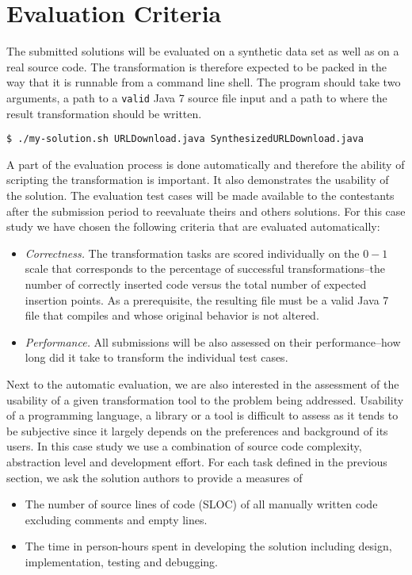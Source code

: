 
\section{Evaluation Criteria}
\label{sec:EvaluationCriteria}

The submitted solutions will be evaluated on a synthetic data set as well as on a real source code.
The transformation is therefore expected to be packed in the way that it is runnable from a command line shell.
The program should take two arguments, a path to a \texttt{valid} Java 7 source file input and a path to where the result transformation should be written.
%
\begin{verbatim}
$ ./my-solution.sh URLDownload.java SynthesizedURLDownload.java
\end{verbatim}

A part of the evaluation process is done automatically and therefore the ability of scripting the transformation is important.
It also demonstrates the usability of the solution.
The evaluation test cases will be made available to the contestants after the submission period to reevaluate theirs and others solutions.
For this case study we have chosen the following criteria that are evaluated automatically:
%
\begin{itemize}[--]
  \item \emph{Correctness.} The transformation tasks are scored individually on the $0-1$ scale that corresponds to the percentage of successful transformations--\Ie the number of correctly inserted code versus the total number of expected insertion points.
  As a prerequisite, the resulting file must be a valid Java 7 file that compiles and whose original behavior is not altered.
  
  \item \emph{Performance.} All submissions will be also assessed on their performance--\Ie how long did it take to transform the individual test cases.
\end{itemize}

Next to the automatic evaluation, we are also interested in the assessment of the usability of a given transformation tool to the problem being addressed.
Usability of a programming language, a library or a tool is difficult to assess as it tends to be subjective since it largely depends on the preferences and background of its users.
In this case study we use a combination of source code complexity, abstraction level and development effort.
For each task defined in the previous section, we ask the solution authors to provide a measures of 
%
\begin{itemize}[--]
  \item The number of source lines of code (SLOC) of all manually written code excluding comments and empty lines.
  \item The time in person-hours spent in developing the solution including design, implementation, testing and debugging.
\end{itemize}

